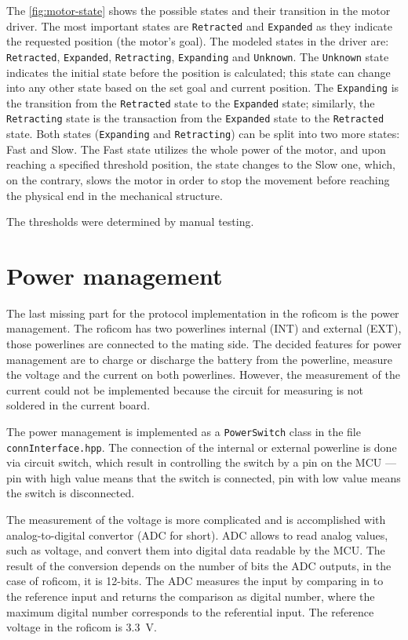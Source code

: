 \documentclass[
  digital,     %
  oneside,     %
  nosansbold,  %
  nocolorbold, %
  nolof,         %
  nolot,         %
]{fithesis4}
\begin{document}
{{{The \autoref{fig:motor-state} shows the possible states and their transition in the motor driver. The most important states are \lstinline|Retracted| and \lstinline|Expanded| as they indicate the requested position (the motor's goal). The modeled states in the driver are: \lstinline|Retracted|, \lstinline|Expanded|, \lstinline|Retracting|, \lstinline|Expanding| and \lstinline|Unknown|. The \lstinline|Unknown| state indicates the initial state before the position is calculated; this state can change into any other state based on the set goal and current position. The \lstinline|Expanding| is the transition from the \lstinline|Retracted| state to the \lstinline|Expanded| state; similarly, the \lstinline|Retracting| state is the transaction from the \lstinline|Expanded| state to the \lstinline|Retracted| state. Both states (\lstinline|Expanding| and \lstinline|Retracting|) can be split into two more states: Fast and Slow. The Fast state utilizes the whole power of the motor, and upon reaching a specified threshold position, the state changes to the Slow one, which, on the contrary, slows the motor in order to stop the movement before reaching the physical end in the mechanical structure.

The thresholds were determined by manual testing.

\section{ Power management }

The last missing part for the protocol implementation in the \acrshort{roficom} is the power management. The \acrshort{roficom} has two powerlines internal (INT) and external (EXT), those powerlines are connected to the mating side. The decided features for power management are to charge or discharge the battery from the powerline, measure the voltage and the current on both powerlines. However, the measurement of the current could not be implemented because the circuit for measuring is not soldered in the current board.

The power management is implemented as a \lstinline|PowerSwitch| class in the file \lstinline|connInterface.hpp|. The connection of the internal or external powerline is done via circuit switch, which result in controlling the switch by a pin on the MCU --- pin with high value means that the switch is connected, pin with low value means the switch is disconnected.

The measurement of the voltage is more complicated and is accomplished with analog-to-digital convertor (ADC for short). ADC allows to read analog values, such as voltage, and convert them into digital data readable by the MCU. The result of the conversion depends on the number of bits the ADC outputs, in the case of \acrshort{roficom}, it is 12-bits. The ADC measures the input by comparing in to the reference input and returns the comparison as digital number, where the maximum digital number corresponds to the referential input. The reference voltage in the \acrshort{roficom} is \qty{3.3}{\volt}.

}}}
\end{document}
